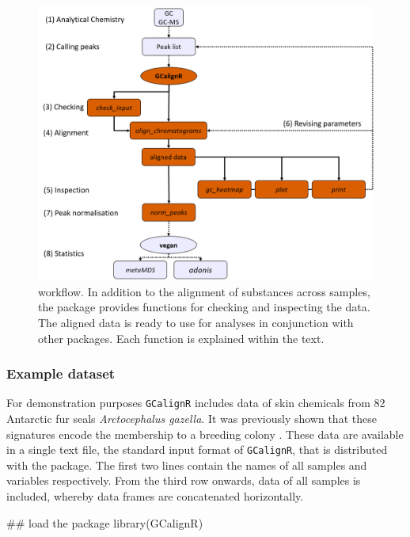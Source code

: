 \begin{figure}[htbp]
\centering
\includegraphics[width=13cm]{figures/workflow}
\caption{ workflow. In addition to the alignment of substances across samples, the package provides functions for checking and inspecting the data. The aligned data is ready to use for analyses in conjunction with other packages. Each function is explained within the text.}
\label{figure:workflow}
\end{figure}

\subsubsection{Example dataset}\label{example-dataset}

For demonstration purposes \texttt{GCalignR} includes data of skin
chemicals from 82 Antarctic fur seals \textit{Arctocephalus gazella}. It
was previously shown that these signatures encode the membership to a
breeding colony \cite{Stoffel.2015}. These data are available in a
single text file, the standard input format of \texttt{GCalignR}, that
is distributed with the package. The first two lines contain the names
of all samples and variables respectively. From the third row onwards,
data of all samples is included, whereby data frames are concatenated
horizontally.

\begin{Schunk}
\begin{Sinput}
## load the package
library(GCalignR)
\end{Sinput}
\end{Schunk}

